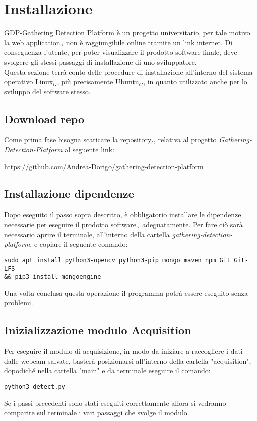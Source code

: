 \section{Installazione}\label{RequisitiDiSistemaEdInstallazioneInstallazione}

 GDP-Gathering Detection Platform è un progetto universitario, per tale motivo la web application$_{\scaleto{G}{3pt}}$ non è raggiungibile online tramite un link internet. Di conseguenza l'utente, per poter visualizzare il prodotto software finale, deve svolgere gli stessi passaggi di installazione di uno sviluppatore.\\
Questa sezione terrà conto delle procedure di installazione all'interno del sistema operativo Linux$_G$, più precisamente Ubuntu$_G$, in quanto utilizzato anche per lo sviluppo del software stesso.

\subsection{Download repo}\label{RequisitiDiSistemaEdInstallazioneInstallazioneDownloadRepo}
Come prima fase bisogna scaricare la repository$_G$ relativa al progetto \textit{Gathering-Detection-Platform} al seguente link:
\begin{center}
	\item \url{https://github.com/Andrea-Dorigo/gathering-detection-platform}
\end{center}

\subsection{Installazione dipendenze}\label{RequisitiDiSistemaEdInstallazioneInstallazioneInstallazioneDipendenze}
Dopo eseguito il passo sopra descritto, è obbligatorio installare le dipendenze necessarie per eseguire il prodotto software$_{\scaleto{G}{3pt}}$ adeguatamente.
Per fare ciò sarà necessario aprire il terminale, all'interno della cartella \textit{gathering-detection-platform}, e copiare il seguente comando:
\begin{lstlisting}
sudo apt install python3-opencv python3-pip mongo maven npm Git Git-LFS 
&& pip3 install mongoengine
\end{lstlisting}

Una volta conclusa questa operazione il programma potrà essere eseguito senza problemi.

\subsection{Inizializzazione modulo Acquisition}\label{RequisitiDiSistemaEdInstallazioneInstallazioneInizializzazioneModuloAcquisition}
Per eseguire il modulo di acquisizione, in modo da iniziare a raccogliere i dati dalle webcam salvate, basterà posizionarsi all'interno della cartella "acquisition", dopodiché nella cartella "main" e da terminale eseguire il comando:
\begin{lstlisting}
python3 detect.py
\end{lstlisting}
Se i passi precedenti sono stati eseguiti correttamente allora si vedranno comparire sul terminale i vari passaggi che svolge il modulo.

